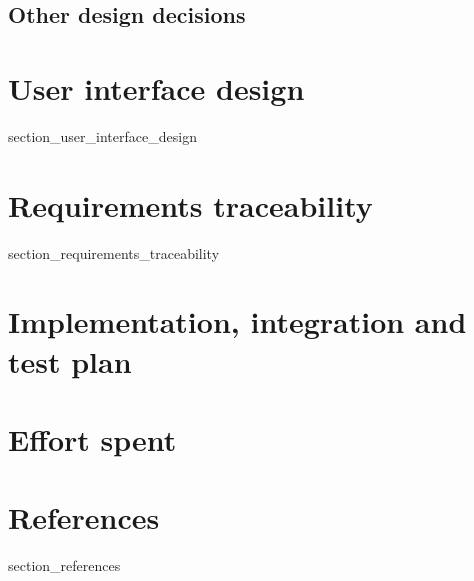 \documentclass[a4paper]{article}
\begin{document}
\subsection{Other design decisions}

\newpage

\section{User interface design}\label{user_interface_design}
{section_user_interface_design}

\newpage

\section{Requirements traceability}\label{requirements_traceability}

{section_requirements_traceability}

\newpage

\section{Implementation, integration and test plan}\label{implementation_integration_test_plan}

\newpage

\section{Effort spent}\label{effort_spent}

\section{References}\label{references}

{section_references}
\end{document}
